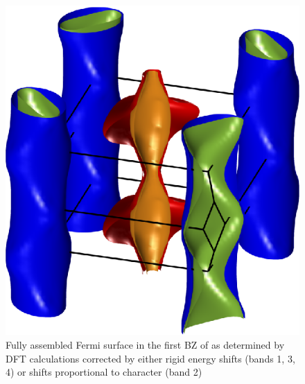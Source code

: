 \begin{figure}[htbp]
    \begin{center}
        \includegraphics[scale=0.7]{Chapter-dHvABaFe2P2/Figures/AngleDepMeasurements/BandCharacterFermiSurface/FullBandCharacterFermiSurface}
        \caption{Fully assembled Fermi surface in the first \ac{BZ} of \BaFeP as determined by \ac{DFT} calculations corrected by either rigid energy shifts (bands 1, 3, 4) or shifts proportional to \DzTwo character (band 2)}
        \label{Fig:ResD:FullBandCharacterFermiSurface}
    \end{center}
\end{figure}

